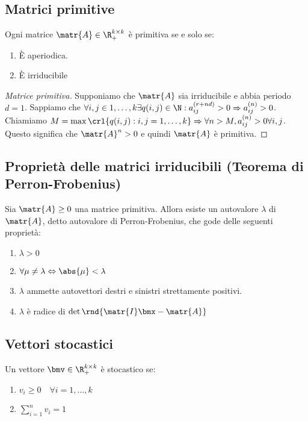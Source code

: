 \documentclass[\main/main.tex]{subfiles}
\begin{document}
\subsection{Matrici primitive}
\begin{definition}
  Ogni matrice \(\matr{A} \in \R^{k\times k}_{+}\) è primitiva se e solo se:
  \begin{enumerate}
    \item È aperiodica.
    \item È irriducibile
  \end{enumerate}
\end{definition}

\begin{proof}[Matrice primitiva]
  Supponiamo che \(\matr{A}\) sia irriducibile e abbia periodo \(d=1\). Sappiamo che \(\forall i,j \in 1, \ldots, k \exists q(i,j) \in \N: a_{ij}^{(r+nd)} >0 \Rightarrow a_{ij}^{(n)} > 0\).
  Chiamiamo \(M = \max\crl{q(i,j): i,j = 1, \ldots, k} \Rightarrow \forall n > M, a_{ij}^{(n)} > 0 \forall i,j\). Questo significa che \(\matr{A}^n>0\) e quindi \(\matr{A}\) è primitiva.
\end{proof}

\subsection{Proprietà delle matrici irriducibili (Teorema di Perron-Frobenius)}

\begin{theorem}
  Sia \(\matr{A} \geq 0\) una matrice primitiva. Allora esiste un autovalore \(\lambda \) di \(\matr{A}\), detto autovalore di Perron-Frobenius, che gode delle seguenti proprietà:
  \begin{enumerate}
    \item \(\lambda > 0\)
    \item \(\forall \mu \neq \lambda \Leftrightarrow \abs{\mu} < \lambda \)
    \item \(\lambda \) ammette autovettori destri e sinistri strettamente positivi.
    \item \(\lambda \) è radice di \(\det\rnd{\matr{I}\bmx - \matr{A}}\)
  \end{enumerate}
\end{theorem}

\subsection{Vettori stocastici}
Un vettore \(\bmv \in \R^{k\times k}_{+}\) è stocastico se:
\begin{enumerate}
  \item \(v_i \geq 0 \quad \forall i = 1, \ldots, k\)
  \item \(\sum_{i=1}^n v_i = 1\)
\end{enumerate}
\end{document}
